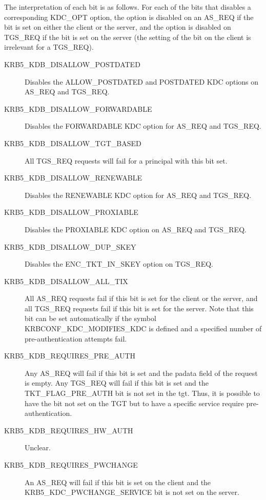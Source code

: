 \begin{description}
The interpretation of each bit is as follows.  For each of the bits
that disables a corresponding KDC_OPT option, the option is disabled
on an AS_REQ if the bit is set on either the client or the server, and
the option is disabled on TGS_REQ if the bit is set on the server (the
setting of the bit on the client is irrelevant for a TGS_REQ).

\begin{description}
\item[KRB5_KDB_DISALLOW_POSTDATED]  Disables the ALLOW_POSTDATED
and POSTDATED KDC options on AS_REQ and TGS_REQ.

\item[KRB5_KDB_DISALLOW_FORWARDABLE] Disables the FORWARDABLE KDC
option for AS_REQ and TGS_REQ.

\item[KRB5_KDB_DISALLOW_TGT_BASED] All TGS_REQ requests will fail for
a principal with this bit set.

\item[KRB5_KDB_DISALLOW_RENEWABLE] Disables the RENEWABLE KDC option for
AS_REQ and TGS_REQ.

\item[KRB5_KDB_DISALLOW_PROXIABLE] Disables the PROXIABLE KDC option on
AS_REQ and TGS_REQ.

\item[KRB5_KDB_DISALLOW_DUP_SKEY] Disables the ENC_TKT_IN_SKEY option on
TGS_REQ.

\item[KRB5_KDB_DISALLOW_ALL_TIX] All AS_REQ requests fail if this bit
is set for the client or the server, and all TGS_REQ requests fail if
this bit is set for the server.  Note that this bit can be set
automatically if the symbol KRBCONF_KDC_MODIFIES_KDC is defined and a
specified number of pre-authentication attempts fail.

\item[KRB5_KDB_REQUIRES_PRE_AUTH] Any AS_REQ will fail if this bit is
set and the padata field of the request is empty.  Any TGS_REQ will
fail if this bit is set and the TKT_FLAG_PRE_AUTH bit is not set in
the tgt.  Thus, it is possible to have the bit not set on the TGT but
to have a specific service require pre-authentication.

\item[KRB5_KDB_REQUIRES_HW_AUTH] Unclear.

\item[KRB5_KDB_REQUIRES_PWCHANGE] An AS_REQ will fail if this bit is
set on the client and the KRB5_KDC_PWCHANGE_SERVICE bit is not set on
the server.


\end{description}
\end{description}
